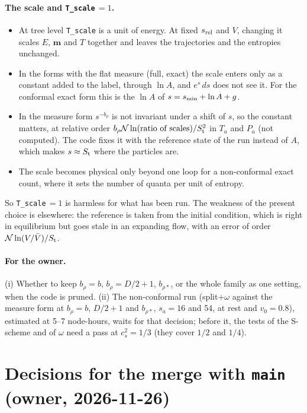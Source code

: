\documentclass[11pt,aps,preprint,nofootinbib,superscriptaddress,tightenlines]{revtex4-2}
\let\oldparagraph\paragraph
\renewcommand{\paragraph}{\par\bigskip\oldparagraph}
\begin{document}
\paragraph{The scale and \texttt{T\_scale}$\,=1$.}
\begin{itemize}
\item At tree level \texttt{T\_scale} is a unit of energy.  At fixed $s_{\rm rel}$ and $V$, changing it scales $E$, $\bm m$ and $T$ together and
  leaves the trajectories and the entropies unchanged.
\item In the forms with the flat measure (full, exact) the scale enters only as a constant added to the label, through $\ln A$, and $e^s\,ds$ does
  not see it.  For the conformal exact form this is the $\ln A$ of $s=s_{\rm min}+\ln A+g$.
\item In the measure form $s^{-b_\rho}$ is not invariant under a shift of $s$, so the constant matters, at relative order
  $b_\rho\mathcal N\ln(\text{ratio of scales})/S_{\rm t}^2$ in $T_a$ and $P_a$ (not computed).  The code fixes it with the reference state of the run
  instead of $A$, which makes $s\approx S_{\rm t}$ where the particles are.
\item The scale becomes physical only beyond one loop for a non-conformal exact count, where it sets the number of quanta per unit of entropy.
\end{itemize}
So \texttt{T\_scale}$\,=1$ is harmless for what has been run.  The weakness of the present choice is elsewhere: the reference is taken from the
initial condition, which is right in equilibrium but goes stale in an expanding flow, with an error of order $\mathcal N\ln(V/\bar V)/S_{\rm t}$.

\paragraph{For the owner.}  (i) Whether to keep $b_\rho=b$, $b_\rho=D/2+1$, $b_{\rho*}$, or the whole family as one setting, when the code is pruned.
(ii) The non-conformal run (split$+\omega$ against the measure form at $b_\rho=b$, $D/2+1$ and $b_{\rho*}$, $s_a=16$ and 54, at rest and $v_0=0.8$),
estimated at 5--7 node-hours, waits for that decision; before it, the tests of the S-scheme and of $\omega$ need a pass at $c_s^2=1/3$ (they cover
$1/2$ and $1/4$).

\section{Decisions for the merge with \texttt{main} (owner, 2026-11-26)}
\label{sec:prune}
\end{document}
